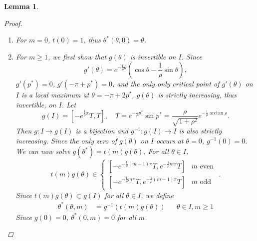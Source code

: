 \documentclass[10pt,reqno]{amsart}
\theoremstyle{plain}
\newtheorem{lemma}[theorem]{Lemma}
\theoremstyle{definition}
\theoremstyle{remark}
\numberwithin{theorem}{section}
\numberwithin{equation}{section}
\begin{document}
\begin{lemma}
\begin{proof}
\begin{enumerate}
\begin{align*}
\end{align*}
Dividing by $e^{-\frac{1}{\rho}m_0 \pi} (-1)^{m_0}$ yields
\begin{equation}\label{thetaeq1}
e^{-\frac{1}{\rho}\theta^*}\sin \theta^* = e^{-\frac{1}{\rho}(m_1 - m_0) \pi} (-1)^{m_1 - m_0} e^{-\frac{1}{\rho}\theta}\sin \theta = 0,
\end{equation}
which only depends on the difference $m_1 - m_0$. Letting $m = m_1 - m_0$, it suffices to solve
\begin{equation}\label{thetaeq2}
g(\theta^*) = t(m) g(\theta)
\end{equation}
for all nonnegative integers $m$, where
\begin{align*}
g(\theta) = e^{-\frac{1}{\rho}\theta}\sin \theta, \quad t(m) = (-1)^m e^{-\frac{1}{\rho}m \pi} 
\end{align*}

\item For $m = 0$, $t(0) = 1$, thus $\theta^*(\theta, 0) = \theta$.

\item For $m \geq 1$, we first show that $g(\theta)$ is invertible on $I$. Since
\begin{equation}\label{gprime}
g'(\theta) = e^{ -\frac{1}{\rho} \theta } \left( \cos \theta - \frac{1}{\rho} \sin \theta \right),
\end{equation}
$g'(p^*) = 0$, $g'(-\pi+p^*) = 0$, and the only only critical point of $g'(\theta)$ on $I$ is a local maximum at $\theta = - \pi + 2 p^*$, $g(\theta)$ is strictly increasing, thus invertible, on $I$. Let
\begin{equation}\label{grange}
g(I) = [-e^{\frac{1}{\rho}\pi} T, T], \quad T = e^{-\frac{1}{\rho}p^*} \sin p^* = \frac{\rho}{\sqrt{1+\rho^2}}e^{-\frac{1}{\rho}\arctan \rho}.
\end{equation}
Then $g: I \rightarrow g(I)$ is a bijection and $g^{-1}: g(I) \rightarrow I$ is also strictly increasing. Since the only zero of $g(\theta)$ on $I$ occurs at $\theta = 0$, $g^{-1}(0) = 0$. We can now solve $g(\theta^*) = t(m) g(\theta)$. For all $\theta \in I$,
\begin{equation}\label{RHSbounds}
	t(m)g(\theta) \in
	\begin{cases}
	[-e^{-\frac{1}{\rho}(m-1) \pi} T, e^{-\frac{1}{\rho}m \pi} T] & m \text{ even }\\
	[-e^{-\frac{1}{\rho}m \pi} T, e^{-\frac{1}{\rho}(m-1) \pi} T] & m \text{ odd }
	\end{cases}.
\end{equation}
Since $t(m)g(\theta) \subset g(I)$ for all $\theta \in I$, we define
\begin{align}\label{solvethetastar}
\theta^*(\theta, m) &= g^{-1}\left( t(m) g(\theta) \right) && \theta \in I, m \geq 1
\end{align}
Since $g(0) = 0$, $\theta^*(0, m) = 0$ for all $m$.


\end{enumerate}
\end{proof}
\end{lemma}
\end{document}

